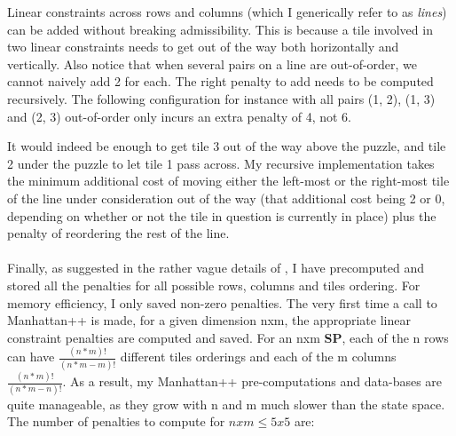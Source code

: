 \begin{itemize}
Linear constraints across rows and columns (which I generically refer to as \textit{lines}) can be added without breaking admissibility. This is because a tile involved in two linear constraints needs to get out of the way both horizontally and vertically. Also notice that when several pairs on a line are out-of-order, we cannot naively add 2 for each. The right penalty to add needs to be computed recursively. The following configuration for instance with all pairs (1, 2), (1, 3) and (2, 3) out-of-order only incurs an extra penalty of 4, not 6.
\begin{center}
\begin{five}
\end{five}
\end{center}
It would indeed be enough to get tile 3 out of the way above the puzzle, and tile 2 under the puzzle to let tile 1 pass across. My recursive implementation takes the minimum additional cost of moving either the left-most or the right-most tile of the line under consideration out of the way (that additional cost being 2 or 0, depending on whether or not the tile in question is currently in place) plus the penalty of reordering the rest of the line.
\\
\\
Finally, as suggested in the rather vague details of \cite{SlidingPuzzleLectureNotes}, I have precomputed and stored all the penalties for all possible rows, columns and tiles ordering. For memory efficiency, I only saved non-zero penalties. The very first time a call to Manhattan++ is made, for a given dimension nxm, the appropriate linear constraint penalties are computed and saved. For an nxm \textbf{SP}, each of the n rows can have $\frac{(n * m)!}{(n * m - m)!}$ different tiles orderings and each of the m columns $\frac{(n * m)!}{(n * m - n)!}$. As a result, my Manhattan++ pre-computations and data-bases are quite manageable, as they grow with n and m much slower than the state space. The number of penalties to compute for $nxm \leq 5x5$ are:



\end{itemize}
